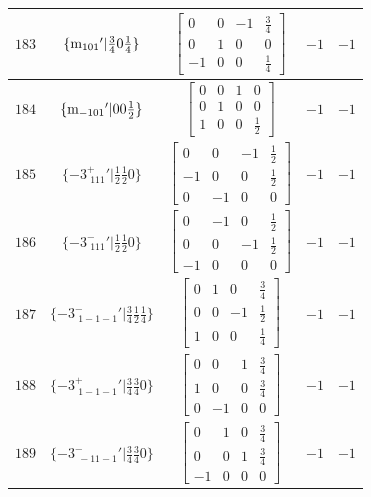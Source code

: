 \documentclass[fleqn,8pt]{jsarticle}
\begin{document}
\begin{longtable}{ccccc}
$ 183 $ & $ \{{\rm m}_{101}{}'|\frac{3}{4} 0 \frac{1}{4}\} $ & $ \begin{bmatrix} 0 & 0 & -1 & \frac{3}{4} \\ 0 & 1 & 0 & 0 \\ -1 & 0 & 0 & \frac{1}{4} \end{bmatrix} $ & $ -1 $ & $ -1 $ \\ \hline
$ 184 $ & $ \{{\rm m}_{-101}{}'|0 0 \frac{1}{2}\} $ & $ \begin{bmatrix} 0 & 0 & 1 & 0 \\ 0 & 1 & 0 & 0 \\ 1 & 0 & 0 & \frac{1}{2} \end{bmatrix} $ & $ -1 $ & $ -1 $ \\ \hline
$ 185 $ & $ \{-3^{+}_{\,\,111}{}'|\frac{1}{2} \frac{1}{2} 0\} $ & $ \begin{bmatrix} 0 & 0 & -1 & \frac{1}{2} \\ -1 & 0 & 0 & \frac{1}{2} \\ 0 & -1 & 0 & 0 \end{bmatrix} $ & $ -1 $ & $ -1 $ \\ \hline
$ 186 $ & $ \{-3^{-}_{\,\,111}{}'|\frac{1}{2} \frac{1}{2} 0\} $ & $ \begin{bmatrix} 0 & -1 & 0 & \frac{1}{2} \\ 0 & 0 & -1 & \frac{1}{2} \\ -1 & 0 & 0 & 0 \end{bmatrix} $ & $ -1 $ & $ -1 $ \\ \hline
$ 187 $ & $ \{-3^{-}_{\,\,1-1-1}{}'|\frac{3}{4} \frac{1}{2} \frac{1}{4}\} $ & $ \begin{bmatrix} 0 & 1 & 0 & \frac{3}{4} \\ 0 & 0 & -1 & \frac{1}{2} \\ 1 & 0 & 0 & \frac{1}{4} \end{bmatrix} $ & $ -1 $ & $ -1 $ \\ \hline
$ 188 $ & $ \{-3^{+}_{\,\,1-1-1}{}'|\frac{3}{4} \frac{3}{4} 0\} $ & $ \begin{bmatrix} 0 & 0 & 1 & \frac{3}{4} \\ 1 & 0 & 0 & \frac{3}{4} \\ 0 & -1 & 0 & 0 \end{bmatrix} $ & $ -1 $ & $ -1 $ \\ \hline
$ 189 $ & $ \{-3^{-}_{\,\,-11-1}{}'|\frac{3}{4} \frac{3}{4} 0\} $ & $ \begin{bmatrix} 0 & 1 & 0 & \frac{3}{4} \\ 0 & 0 & 1 & \frac{3}{4} \\ -1 & 0 & 0 & 0 \end{bmatrix} $ & $ -1 $ & $ -1 $ \\ \hline

\end{longtable}
\end{document}
